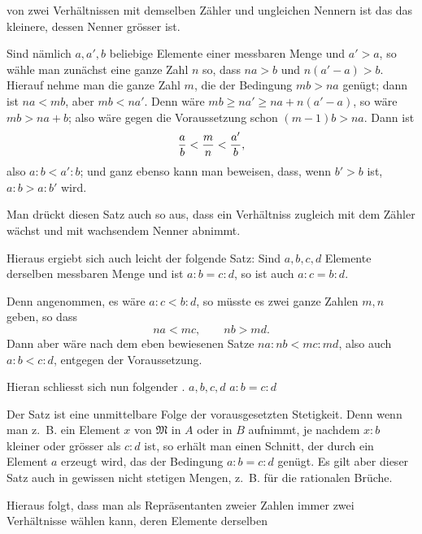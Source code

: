 von zwei Verhältnissen mit demselben Zähler und ungleichen Nennern ist
das das kleinere, dessen Nenner grösser ist.

Sind nämlich $a,a',b$ beliebige Elemente einer messbaren Menge und
$a'>a$, so wähle man zunächst eine ganze Zahl $n$ so, dass $na>b$ und
$n(a'-a)>b$. Hierauf nehme man die  ganze Zahl $m$,
die der Bedingung $mb>na$ genügt; dann ist $na<mb$, aber $mb<na'$.
Denn wäre $mb\ge na'\ge na+n(a'-a)$, so wäre $mb>na+b$; also wäre gegen
die Voraussetzung schon $(m-1)b>na$. Dann ist
\[
 {a\over b}<{m\over n}<{a'\over b},
\]
also $a:b<a':b$; und ganz ebenso kann man beweisen, dass, wenn $b'>b$
ist, $a:b>a:b'$ wird.

Man drückt diesen Satz auch so aus, dass ein Verhältniss zugleich mit
dem Zähler wächst und mit wachsendem Nenner abnimmt.

Hieraus ergiebt sich auch leicht der folgende Satz: Sind $a,b,c,d$
Elemente derselben messbaren Menge und ist $a:b=c:d$, so ist auch
$a:c=b:d$.

Denn angenommen, es wäre $a:c<b:d$, so müsste es zwei ganze Zahlen
$m,n$ geben, so dass
\[
 na<mc,
 \qquad nb>md.
\]
Dann aber wäre nach dem eben bewiesenen Satze $na:nb<mc:md$, also auch
$a:b<c:d$, entgegen der Voraussetzung.

Hieran schliesst sich nun folgender .
 $a,b,c,d$  $a:b=c:d$ 

Der Satz ist eine unmittelbare Folge der vorausgesetzten Stetigkeit.
Denn wenn man z.~B. ein Element $x$ von $\mathfrak M$ in $A$ oder in
$B$ aufnimmt, je nachdem $x:b$ kleiner oder grösser als $c:d$ ist, so
erhält man einen Schnitt, der durch ein Element $a$ erzeugt wird, das
der Bedingung $a:b=c:d$ genügt. Es gilt aber dieser Satz auch in
gewissen nicht stetigen Mengen, z.~B. für die rationalen Brüche.

Hieraus folgt, dass man als Repräsentanten zweier Zahlen immer zwei
Verhältnisse wählen kann, deren Elemente derselben
